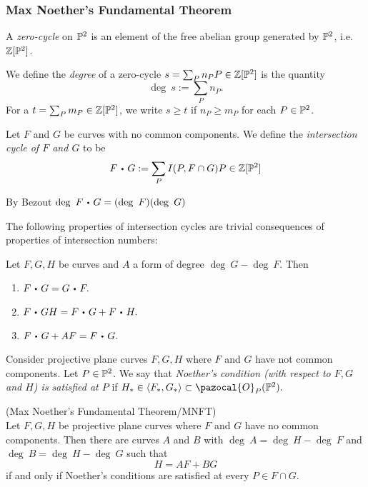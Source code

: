 \subsubsection{Max Noether's Fundamental Theorem}
    \begin{definition}
        A \textit{zero-cycle} on $\mathbb{P}^2$ is an element of the free abelian group generated by $\mathbb{P}^2$, i.e. $\mathbb{Z}[\mathbb{P}^2]$.
    \end{definition}
    \begin{definition}
        We define the \textit{degree} of a zero-cycle $s=\sum_P n_PP\in \mathbb{Z}[\mathbb{P}^2]$ is the quantity
        $$\deg \ s := \sum_P n_P.$$
        For a $t= \sum_P m_P\in \mathbb{Z}[\mathbb{P}^2]$, we write $s\geq t$ if $n_P\geq m_P$ for each $P\in \mathbb{P}^2$.
    \end{definition}
    \begin{definition}
        Let $F$ and $G$ be curves with no common components. We define the \textit{intersection cycle of $F$ and $G$} to be 
        $$F\ic G:= \sum_P I(P,F\cap G)P\in\Z[\Pp^2]$$
    \end{definition}
    \begin{remark}
        By Bezout $\deg \ F\ic G = (\deg\ F)(\deg \ G)$
    \end{remark}
    The following properties of intersection cycles are trivial consequences of properties of intersection numbers:
    \begin{lemma}
        Let $F,G,H$ be curves and $A$ a form of degree $\deg \ G - \deg \ F$. Then 
        \begin{enumerate}
            \item $F\ic G = G\ic F.$
            \item $F\ic GH = F\ic G + F\ic H.$
            \item $F\ic G + AF = F \ic G.$
        \end{enumerate}
    \end{lemma}
    \begin{definition}
        Consider projective plane curves $F,G,H$ where $F$ and $G$ have not common components. Let $P\in\mathbb{P}^2$. We say that \textit{Noether's condition (with respect to $F,G$ and $H$) is satisfied at $P$} if $H_\ast \in \langle F_\ast,G_\ast\rangle \subset \pazocal{O}_P(\Pp^2).$
    \end{definition}
    \begin{theorem}\label{MaxNoethersFundamentalTheorem}(Max Noether's Fundamental Theorem/MNFT)\\
        Let $F,G,H$ be projective plane curves where $F$ and $G$ have no common components. Then there are curves $A$ and $B$ with $\deg \ A = \deg \ H-\deg \ F$ and $\deg \ B = \deg \ H -\deg \ G$ such that 
        $$ H= AF+BG$$
        if and only if Noether's conditions are satisfied at every $P\in F\cap G$.
    \end{theorem}
